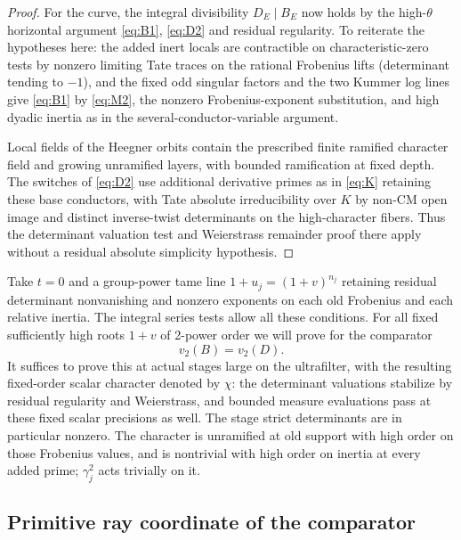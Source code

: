 \begin{proof}
For the curve, the integral divisibility \(D_E\mid B_E\) now holds by the
high-\(\theta\) horizontal argument \eqref{eq:B1}, \eqref{eq:D2} and residual
regularity. To reiterate the hypotheses here: the added inert locals are
contractible on characteristic-zero tests by nonzero limiting Tate traces on
the rational Frobenius lifts (determinant tending to \(-1\)), and the fixed
odd singular factors and the two Kummer log lines give \eqref{eq:B1} by
\eqref{eq:M2}, the nonzero Frobenius-exponent substitution, and high dyadic
inertia as in the several-conductor-variable argument.

Local fields of the Heegner orbits contain the prescribed finite ramified
character field and growing unramified layers, with bounded ramification at
fixed depth. The switches of \eqref{eq:D2} use additional derivative primes as
in \eqref{eq:K} retaining these base conductors, with Tate absolute
irreducibility over \(K\) by non-CM open image and distinct inverse-twist
determinants on the high-character fibers. Thus the determinant valuation test
and Weierstrass remainder proof there apply without a residual absolute
simplicity hypothesis.
\end{proof}

Take \(t=0\) and a group-power tame line \(1+u_j=(1+v)^{n_j}\) retaining
residual determinant nonvanishing and nonzero exponents on each old Frobenius
and each relative inertia. The integral series tests allow all these
conditions. For all fixed sufficiently high roots \(1+v\) of 2-power order we
will prove for the comparator
\[
                               v_2(B)=v_2(D).                         \tag{Y1}\label{eq:Y1}
\]
It suffices to prove this at actual stages large on the ultrafilter, with the
resulting fixed-order scalar character denoted by \(\chi\): the determinant
valuations stabilize by residual regularity and Weierstrass, and bounded
measure evaluations pass at these fixed scalar precisions as well. The stage
strict determinants are in particular nonzero. The character is unramified at
old support with high order on those Frobenius values, and is nontrivial with
high order on inertia at every added prime; \(\gamma_j^2\) acts trivially on
it.


\subsection{Primitive ray coordinate of the comparator}

